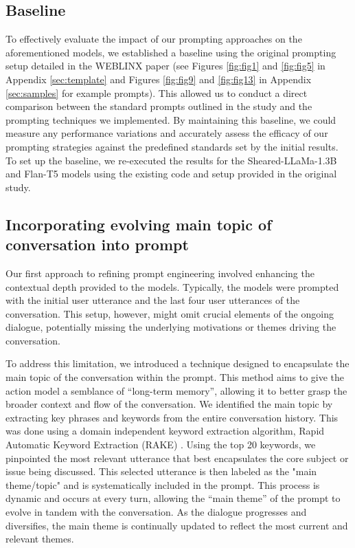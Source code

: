 \documentclass[11pt]{article}
\begin{document}
\subsection{Baseline}
To effectively evaluate the impact of our prompting approaches on the aforementioned models, we established a baseline using the original prompting setup detailed in the WEBLINX paper (see Figures \ref{fig:fig1} and \ref{fig:fig5} in Appendix \ref{sec:template} and Figures \ref{fig:fig9} and \ref{fig:fig13} in Appendix \ref{sec:samples} for example prompts). This allowed us to conduct a direct comparison between the standard prompts outlined in the study and the prompting techniques we implemented. By maintaining this baseline, we could measure any performance variations and accurately assess the efficacy of our prompting strategies against the predefined standards set by the initial results. To set up the baseline, we re-executed the results for the Sheared-LLaMa-1.3B and Flan-T5 models using the existing code and setup provided in the original study. 


\subsection{Incorporating evolving main topic of conversation into prompt}
Our first approach to refining prompt engineering involved enhancing the contextual depth provided to the models. Typically, the models were prompted with the initial user utterance and the last four user utterances of the conversation. This setup, however, might omit crucial elements of the ongoing dialogue, potentially missing the underlying motivations or themes driving the conversation.

To address this limitation, we introduced a technique designed to encapsulate the main topic of the conversation within the prompt. This method aims to give the action model a semblance of “long-term memory”, allowing it to better grasp the broader context and flow of the conversation. We identified the main topic by extracting key phrases and keywords from the entire conversation history. This was done using a domain independent keyword extraction algorithm, Rapid Automatic Keyword Extraction (RAKE) \cite{rake-nltk}. Using the top 20 keywords, we pinpointed the most relevant utterance that best encapsulates the core subject or issue being discussed. This selected utterance is then labeled as the "main theme/topic" and is systematically included in the prompt. This process is dynamic and occurs at every turn, allowing the “main theme” of the prompt to evolve in tandem with the conversation. As the dialogue progresses and diversifies, the main theme is continually updated to reflect the most current and relevant themes.
\end{document}
